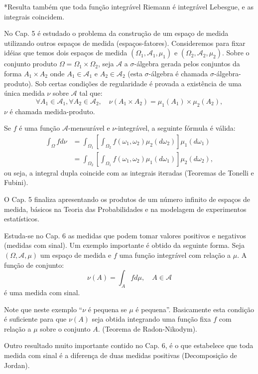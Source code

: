 \documentclass[
]{book}
\begin{document}
*Resulta também que toda função integrável Riemann é integrável Lebesgue, e as integrais coincidem.

No Cap. 5 é estudado o problema da construção de um espaço de medida utilizando outros espaços de medida (espaços-fatores). Consideremos para fixar idéias que temos dois espaços de medida \((\Omega_1, \mathscr{A}_1, \mu_1)\) e \((\Omega_2, \mathscr{A}_2, \mu_2)\). Sobre o conjunto produto \(\Omega = \Omega_1 \times \Omega_2\), seja \(\mathscr{A}\) a \(\sigma\)-álgebra gerada pelos conjuntos da forma \(A_1 \times A_2\) onde \(A_1 \in \mathscr{A}_1\) e \(A_2 \in \mathscr{A}_2\) (esta \(\sigma\)-álgebra é chamada \(\sigma\)-álgebra-produto). Sob certas condições de regularidade é provada a existência de uma única medida \(\nu\) sobre \(\mathscr{A}\) tal que: \[ \forall A_1 \in \mathscr{A}_1, \forall A_2 \in \mathscr{A}_2, \quad \nu(A_1 \times A_2) = \mu_1(A_1) \times \mu_2(A_2), \] \(\nu\) é chamada medida-produto.

Se \(f\) é uma função \(\mathscr{A}\)-mensurável e \(\nu\)-integrável, a seguinte fórmula é válida: \[ \begin{aligned} \int_{\Omega} f d\nu &= \int_{\Omega_1} \left[ \int_{\Omega_2} f(\omega_1, \omega_2) \mu_2(d\omega_2) \right] \mu_1(d\omega_1) \\ &= \int_{\Omega_2} \left[ \int_{\Omega_1} f(\omega_1, \omega_2) \mu_1(d\omega_1) \right] \mu_2(d\omega_2), \end{aligned} \] ou seja, a integral dupla coincide com as integrais iteradas (Teoremas de Tonelli e Fubini).

O Cap. 5 finaliza apresentando os produtos de um número infinito de espaços de medida, básicos na Teoria das Probabilidades e na modelagem de experimentos estatísticos.

Estuda-se no Cap. 6 as medidas que podem tomar valores positivos e negativos (medidas com sinal). Um exemplo importante é obtido da seguinte forma. Seja \((\Omega, \mathscr{A}, \mu)\) um espaço de medida e \(f\) uma função integrável com relação a \(\mu\). A função de conjunto: \[ \nu(A) = \int_{A} f d\mu, \quad A \in \mathscr{A} \] é uma medida com sinal.

Note que neste exemplo ``\(\nu\) é pequena se \(\mu\) é pequena''. Basicamente esta condição é suficiente para que \(\nu(A)\) seja obtida integrando uma função fixa \(f\) com relação a \(\mu\) sobre o conjunto \(A\). (Teorema de Radon-Nikodym).

Outro resultado muito importante contido no Cap. 6, é o que estabelece que toda medida com sinal é a diferença de duas medidas positivas (Decomposição de Jordan).
\end{document}
